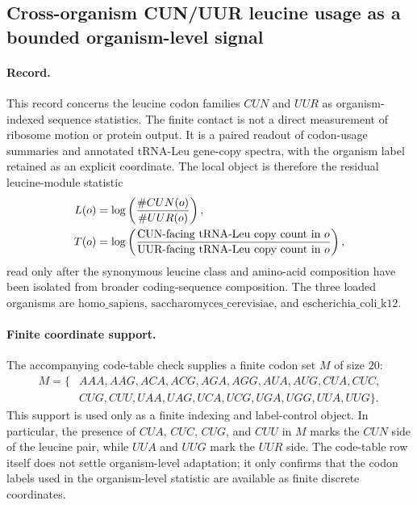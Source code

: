 \subsection{Cross-organism CUN/UUR leucine usage as a bounded organism-level signal}\label{sec:bior-reality-cross-organism-cun-uur-leu-gate}

\paragraph{Record.}
This record concerns the leucine codon families $CUN$ and $UUR$ as organism-indexed sequence statistics.  The finite contact is not a direct measurement of ribosome motion or protein output.  It is a paired readout of codon-usage summaries and annotated tRNA-Leu gene-copy spectra, with the organism label retained as an explicit coordinate.  The local object is therefore the residual leucine-module statistic
$$
\begin{aligned}
  L(o) &= \log\left(\frac{\#CUN(o)}{\#UUR(o)}\right),\\
  T(o) &= \log\left(\frac{\hbox{CUN-facing tRNA-Leu copy count in }o}{\hbox{UUR-facing tRNA-Leu copy count in }o}\right),
\end{aligned}
$$
read only after the synonymous leucine class and amino-acid composition have been isolated from broader coding-sequence composition.  The three loaded organisms are $\mathrm{homo\_sapiens}$, $\mathrm{saccharomyces\_cerevisiae}$, and $\mathrm{escherichia\_coli\_k12}$.

\paragraph{Finite coordinate support.}
The accompanying code-table check supplies a finite codon set $M$ of size $20$:
$$
\begin{aligned}
M = \{&AAA,AAG,ACA,ACG,AGA,AGG,AUA,AUG,CUA,CUC,\\
     &CUG,CUU,UAA,UAG,UCA,UCG,UGA,UGG,UUA,UUG\}.
\end{aligned}
$$
This support is used only as a finite indexing and label-control object.  In particular, the presence of $CUA$, $CUC$, $CUG$, and $CUU$ in $M$ marks the $CUN$ side of the leucine pair, while $UUA$ and $UUG$ mark the $UUR$ side.  The code-table row itself does not settle organism-level adaptation; it only confirms that the codon labels used in the organism-level statistic are available as finite discrete coordinates.

